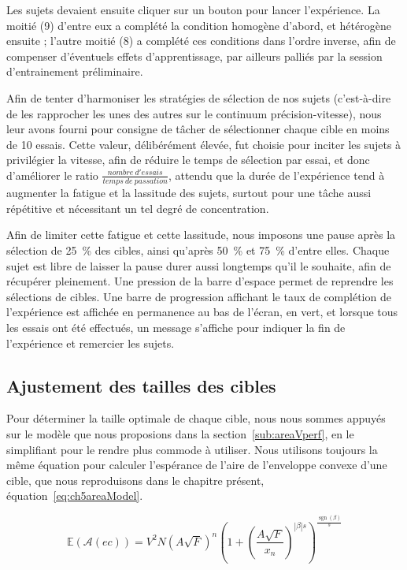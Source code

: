 	Les sujets devaient ensuite cliquer sur un bouton pour lancer l'expérience. La moitié (9) d'entre eux a complété la condition homogène d'abord, et hétérogène ensuite ; l'autre moitié (8) a complété ces conditions dans l'ordre inverse, afin de compenser d'éventuels effets d'apprentissage, par ailleurs palliés par la session d'entrainement préliminaire.
	
	Afin de tenter d'harmoniser les stratégies de sélection de nos sujets (c'est-à-dire de les rapprocher les unes des autres sur le continuum précision-vitesse), nous leur avons fourni pour consigne de tâcher de sélectionner chaque cible en moins de 10 essais. Cette valeur, délibérément élevée, fut choisie pour inciter les sujets à privilégier la vitesse, afin de réduire le temps de sélection par essai, et donc d'améliorer le ratio $\frac{nombre~d'essais}{temps~de~passation}$, attendu que la durée de l'expérience tend à augmenter la fatigue et la lassitude des sujets, surtout pour une tâche aussi répétitive et nécessitant un tel degré de concentration.
	
	Afin de limiter cette fatigue et cette lassitude, nous imposons une pause après la sélection de 25~\%{} des cibles, ainsi qu'après 50~\%{} et 75~\%{} d'entre elles. Chaque sujet est libre de laisser la pause durer aussi longtemps qu'il le souhaite, afin de récupérer pleinement. Une pression de la barre d'espace permet de reprendre les sélections de cibles. Une barre de progression affichant le taux de complétion de l'expérience est affichée en permanence au bas de l'écran, en vert, et lorsque tous les essais ont été effectués, un message s'affiche pour indiquer la fin de l'expérience et remercier les sujets.
	
	\subsection{Ajustement des tailles des cibles}
	Pour déterminer la taille optimale de chaque cible, nous nous sommes appuyés sur le modèle que nous proposions dans la section~\ref{sub:areaVperf}, en le simplifiant pour le rendre plus commode à utiliser. Nous utilisons toujours la même équation pour calculer l'espérance de l'aire de l'enveloppe convexe d'une cible, que nous reproduisons dans le chapitre présent, équation~\ref{eq:ch5areaModel}.
	
	\begin{equation}
		\mathbb{E}(\mathcal{A}(ec)) = V^{2}N \left( A\sqrt{F} \right)^n \left(1+\left(\frac{A\sqrt{F}}{x_n}\right)^{|\beta|s}\right)^{\frac{\operatorname{sgn}(\beta)}{s}}
		\label{eq:ch5areaModel}
	\end{equation}
	
